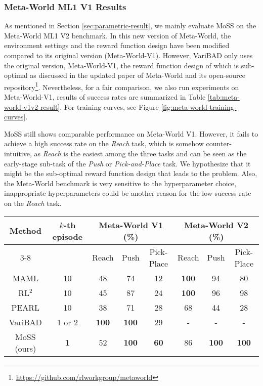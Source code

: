 \documentclass[letterpaper]{article} %
\begin{document}
\subsubsection{Meta-World ML1 V1 Results}
\label{sec:meta-world-v1v2}
As mentioned in Section \ref{sec:parametric-result}, we mainly evaluate MoSS on the Meta-World ML1 V2 benchmark. In this new version of Meta-World, the environment settings and the reward function design have been
modified compared to its original version (Meta-World-V1). However, VariBAD \cite{VariBAD}
only uses the original version, Meta-World-V1, the reward function design of which is sub-optimal as
discussed in the updated paper of Meta-World \cite{MetaWorld} and its open-source repository\footnote{\url{https://github.com/rlworkgroup/metaworld}}. Nevertheless, for a fair comparison, we also run experiments on Meta-World-V1, results of success rates are summarized in Table \ref{tab:meta-world-v1v2-result}. For training curves, see Figure \ref{fig:meta-world-training-curves}.




MoSS still shows comparable performance on Meta-World V1. However, it fails to achieve a high success rate on the \emph{Reach} task, which is somehow counter-intuitive, as \emph{Reach} is the easiest among the three tasks and can be seen as the early-stage sub-task of the \emph{Push} or \emph{Pick-and-Place} task. We hypothesize that it might be the sub-optimal reward function design that leads to the problem. Also, the Meta-World benchmark is very sensitive to the hyperparameter choice, inappropriate hyperparameters could be another reason for the low success rate on the \emph{Reach} task.

\begin{table*}[tp]
  \centering
  \caption {Meta-World ML 1 V1 and V2 results}\footnotemark
    \begin{tabular}{c|c|c|c|c|c|c|c}
    \toprule
    \multirow{2}[4]{*}{Method} & \multirow{2}[4]{*}{$k$-th episode} & \multicolumn{3}{c|}{Meta-World V1 (\%)} & \multicolumn{3}{c}{Meta-World V2 (\%)} \\
\cmidrule{3-8}          &       & Reach & Push  & Pick-Place & Reach & Push  & Pick-Place \\
    \midrule
    MAML  & 10    & 48    & 74    & 12    & \textbf{100} & 94    & 80 \\
    RL$^{2}$   & 10    & 45    & 87    & 24    & \textbf{100} & 96 & 98 \\
    PEARL & 10    & 38    & 71    & 28    & 68    & 44    & 28 \\
    VariBAD & 1 or 2   & \textbf{100} & \textbf{100} & 29    & -     & -     & - \\
    MoSS (ours) & \textbf{1}     & 52    & \textbf{100} & \textbf{60} & 86    & \textbf{100}    & \textbf{100} \\
    \bottomrule
    \end{tabular}
  \label{tab:meta-world-v1v2-result}
\end{table*}
\end{document}
